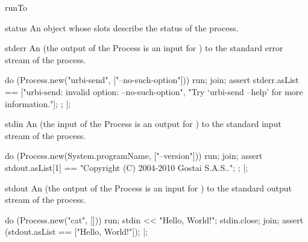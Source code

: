 \begin{urbiscriptapi}
\item[runTo]
\item[status] An object whose slots describe the status of the
  process.
\item[stderr] An  (the output of the Process is
  an input for \urbi) to the standard error stream of the process.
\begin{urbiscript}
do (Process.new("urbi-send", ["--no-such-option"]))
{
  run;
  join;
  assert
  {
    stderr.asList ==
    ["urbi-send: invalid option: --no-such-option",
     "Try `urbi-send --help' for more information."];
  };
}|;
\end{urbiscript}

\item[stdin] An  (the input of the Process is
  an output for \urbi) to the standard input stream of the process.
\begin{urbiscript}
do (Process.new(System.programName, ["--version"]))
{
  run;
  join;
  assert
  {
    stdout.asList[1] == "Copyright (C) 2004-2010 Gostai S.A.S..";
  };
}|;
\end{urbiscript}

\item[stdout] An  (the output of the Process is
  an input for \urbi) to the standard output stream of the process.
\begin{urbiscript}
do (Process.new("cat", []))
{
  run;
  stdin << "Hello, World!\n";
  stdin.close;
  join;
  assert (stdout.asList == ["Hello, World!"]);
}|;
\end{urbiscript}
\end{urbiscriptapi}


